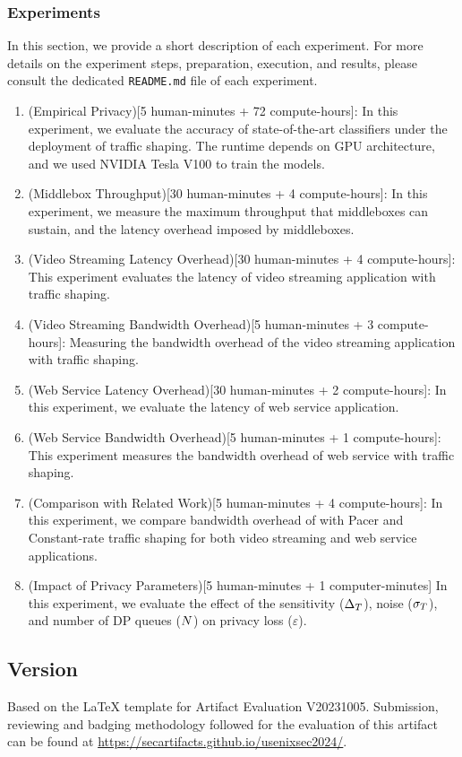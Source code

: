 \subsubsection{Experiments}\label{subsubsec:experiments}
In this section, we provide a short description of each experiment. For more details on the experiment steps, preparation, execution, and results, please consult the dedicated \texttt{README.md} file of each experiment.
\begin{enumerate}[label=\textbf{(E\arabic*):}, leftmargin=1.2cm]
  \item (Empirical Privacy)[5 human-minutes + 72 compute-hours]: In this experiment, we evaluate the accuracy of state-of-the-art classifiers under the deployment of {\sys} traffic shaping. The runtime depends on GPU architecture, and we used NVIDIA Tesla V100 to train the models.
   
  \item (Middlebox Throughput)[30 human-minutes + 4 compute-hours]: In this experiment, we measure the maximum throughput that {\sys} middleboxes can sustain, and the latency overhead imposed by {\sys} middleboxes.
  \item (Video Streaming Latency Overhead)[30 human-minutes + 4 compute-hours]: This exper\texttt{}iment evaluates the latency of video streaming application with {\sys} traffic shaping.
  \item (Video Streaming Bandwidth Overhead)[5 human-minutes + 3 compute-hours]: Measuring the bandwidth overhead of the video streaming application with {\sys} traffic shaping.
  \item (Web Service Latency Overhead)[30 human-minutes + 2 compute-hours]: In this experiment, we evaluate the latency of web service application. 
  \item (Web Service Bandwidth Overhead)[5 human-minutes + 1 compute-hours]: This experiment measures the bandwidth overhead of web service with {\sys} traffic shaping.
  \item (Comparison with Related Work)[5 human-minutes + 4 compute-hours]: In this experiment, we compare bandwidth overhead of {\sys} with Pacer and Constant-rate traffic shaping for both video streaming and web service applications.
  \item (Impact of Privacy Parameters)[5 human-minutes + 1 computer-minutes] In this experiment, we evaluate the effect of the sensitivity ($\Delta_T$), noise ($\sigma_T$), and number of DP queues ($N$) on privacy loss ($\varepsilon$).
\end{enumerate}






\subsection{Version}
Based on the LaTeX template for Artifact Evaluation V20231005. Submission,
reviewing and badging methodology followed for the evaluation of this artifact
can be found at \url{https://secartifacts.github.io/usenixsec2024/}.